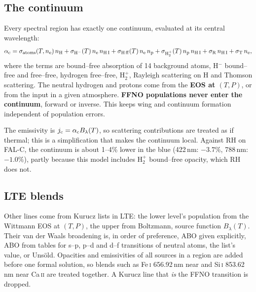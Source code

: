 \subsection{The continuum}
Every spectral region has exactly one continuum, evaluated at its central wavelength:
\begin{equation}
\alpha_{\rm c}=\sigma_{\rm atoms}(T,n_{\rm e})\,n_{\rm H}+\sigma_{\rm H^-}(T)\,n_{\rm e}\,n_{\rm H\,I}+\sigma_{\rm H\,ff}(T)\,n_{\rm e}\,n_{\rm p}+\sigma_{\rm H_2^+}(T)\,n_{\rm p}\,n_{\rm H\,I}+\sigma_{\rm R}\,n_{\rm H\,I}+\sigma_{\rm T}\,n_{\rm e} ,
\end{equation}
where the terms are bound--free absorption of 14 background atoms, H$^-$ bound--free and free--free, hydrogen free--free, H$_2^+$, Rayleigh scattering on H and Thomson scattering. The neutral hydrogen and protons come from the \textbf{EOS at $(T,P)$}, or from the input in a given atmosphere. \textbf{FFNO populations never enter the continuum}, forward or inverse. This keeps wing and continuum formation independent of population errors.

The emissivity is $j_{\rm c}=\alpha_{\rm c}B_\lambda(T)$, so scattering contributions are treated as if thermal; this is a simplification that makes the continuum local. Against RH on FAL-C, the continuum is about 1--4\% lower in the blue (422\,nm: $-3.7$\%, 788\,nm: $-1.0$\%), partly because this model includes H$_2^+$ bound--free opacity, which RH does not.

\subsection{LTE blends}
Other lines come from Kurucz lists in LTE: the lower level's population from the Wittmann EOS at $(T,P)$, the upper from Boltzmann, source function $B_\lambda(T)$. Their van der Waals broadening is, in order of preference, ABO given explicitly, ABO from tables for s--p, p--d and d--f transitions of neutral atoms, the list's value, or Uns\"old. Opacities and emissivities of all sources in a region are added before one formal solution, so blends such as Fe\,\textsc{i} 656.92\,nm near \Halpha{} and Si\,\textsc{i} 853.62\,nm near Ca\,\textsc{ii} are treated together. A Kurucz line that \emph{is} the FFNO transition is dropped.

